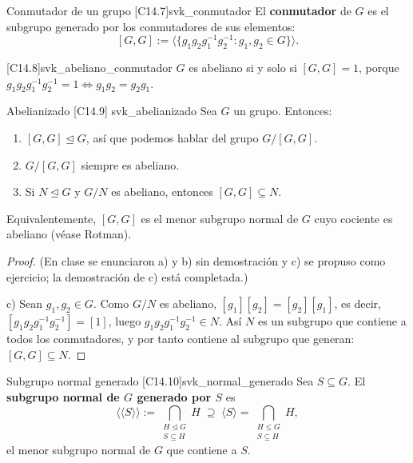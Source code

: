 \begin{definicion}{Conmutador de un grupo [C14.7]}{svk_conmutador}
El \textbf{conmutador} de $G$ es el subgrupo generado por los conmutadores de sus elementos:
\[ [G,G] := \big\langle \{ g_1 g_2 g_1^{-1} g_2^{-1} : g_1, g_2 \in G \} \big\rangle. \]
\end{definicion}

\begin{observacion}{[C14.8]}{svk_abeliano_conmutador}
$G$ es abeliano si y solo si $[G,G] = 1$, porque $g_1 g_2 g_1^{-1} g_2^{-1} = 1 \iff g_1 g_2 = g_2 g_1$.
\end{observacion}

\begin{teorema}{Abelianizado [C14.9] \marcaE}{svk_abelianizado}
Sea $G$ un grupo. Entonces:
\begin{enumerate}
    \item[a)] $[G,G] \trianglelefteq G$, así que podemos hablar del grupo $G/[G,G]$.
    \item[b)] $G/[G,G]$ siempre es abeliano.
    \item[c)] Si $N \trianglelefteq G$ y $G/N$ es abeliano, entonces $[G,G] \subseteq N$.
\end{enumerate}
Equivalentemente, $[G,G]$ es el menor subgrupo normal de $G$ cuyo cociente es abeliano (véase Rotman).
\end{teorema}

\begin{proof}
(En clase se enunciaron a) y b) sin demostración y c) se propuso como ejercicio; la demostración de c) está completada.)

c) Sean $g_1, g_2 \in G$. Como $G/N$ es abeliano, $[g_1][g_2] = [g_2][g_1]$, es decir, $[g_1 g_2 g_1^{-1} g_2^{-1}] = [1]$, luego $g_1 g_2 g_1^{-1} g_2^{-1} \in N$. Así $N$ es un subgrupo que contiene a todos los conmutadores, y por tanto contiene al subgrupo que generan: $[G,G] \subseteq N$.
\end{proof}

\begin{definicion}{Subgrupo normal generado [C14.10]}{svk_normal_generado}
Sea $S \subseteq G$. El \textbf{subgrupo normal de $G$ generado por $S$} es
\[ \langle\langle S \rangle\rangle := \bigcap_{\substack{H \trianglelefteq G \\ S \subseteq H}} H \;\supseteq\; \langle S \rangle = \bigcap_{\substack{H \leq G \\ S \subseteq H}} H, \]
el menor subgrupo normal de $G$ que contiene a $S$.
\end{definicion}


